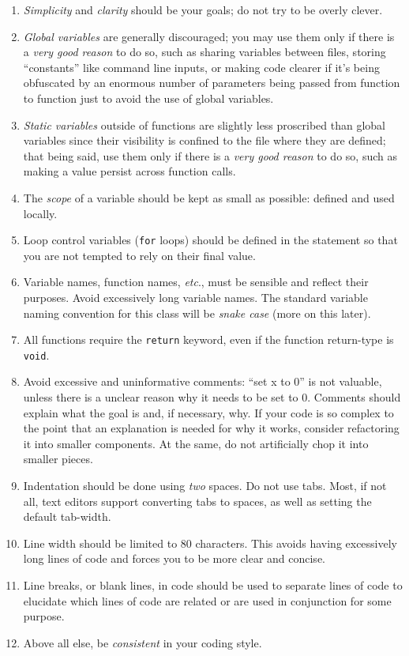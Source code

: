 \documentclass[11pt]{article}
\begin{document}
\begin{enumerate}
    \item \emph{Simplicity} and \emph{clarity} should be your goals; do not try
        to be overly clever.
    \item \emph{Global variables} are generally discouraged; you may use them
        only if there is a \emph{very good reason} to do so, such as sharing
        variables between files, storing ``constants'' like command line inputs, or
        making code clearer if it's being obfuscated by an enormous number of
        parameters being passed from function to function just to avoid the use
        of global variables.
    \item \emph{Static variables} outside of functions are slightly less
        proscribed than global variables since their visibility is confined to
        the file where they are defined; that being said, use them only if
        there is a \emph{very good reason} to do so, such as making a value
        persist across function calls.
    \item The \emph{scope} of a variable should be kept as small as possible: defined
        and used locally.
    \item Loop control variables (\texttt{for} loops) should be defined in the
        statement so that you are not tempted to rely on their final value.
    \item Variable names, function names, \emph{etc}., must be sensible and reflect
        their purposes. Avoid excessively long variable names. The standard
        variable naming convention for this class will be \emph{snake case} (more on
        this later).
    \item All functions require the \texttt{return} keyword, even if the
        function return-type is \texttt{void}.
    \item Avoid excessive and uninformative comments: ``set x to 0'' is not
        valuable, unless there is a unclear reason why it needs to be set to 0.
        Comments should explain what the goal is and, if necessary, why.
        If your code is so complex to the point that an explanation is needed
        for why it works, consider refactoring it into smaller components. At
        the same, do not artificially chop it into smaller pieces.
    \item Indentation should be done using \emph{two} spaces. Do not use tabs. Most, if
        not all, text editors support converting tabs to spaces, as well as
        setting the default tab-width.
    \item Line width should be limited to 80 characters. This avoids having
        excessively long lines of code and forces you to be more clear and
        concise.
    \item Line breaks, or blank lines, in code should be used to separate lines
        of code to elucidate which lines of code are related or are used in
        conjunction for some purpose.
    \item Above all else, be \emph{consistent} in your coding style.
\end{enumerate}
\end{document}
